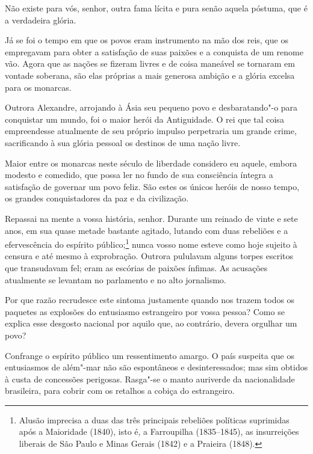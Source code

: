 \setcounter{@sectionNumCenter}{1}

\sectionitem

\begin{linenumbers}

Não existe para vós, senhor, outra fama lícita e pura senão aquela 
póstuma, que é a verdadeira glória.

Já se foi o tempo em que os povos eram instrumento na mão dos reis, que
os empregavam para obter a satisfação de suas paixões e a conquista de
um renome vão. Agora que as nações se fizeram livres e de coisa
maneável se tornaram em vontade soberana, são elas próprias a mais
generosa ambição e a glória excelsa para os monarcas.

Outrora Alexandre, arrojando à Ásia seu pequeno povo e desbaratando"-o
para conquistar um mundo, foi o maior herói da Antiguidade. O rei que
tal coisa empreendesse atualmente de seu próprio impulso perpetraria um
grande crime, sacrificando à sua glória pessoal os destinos de uma nação livre. 

Maior entre os monarcas neste século de liberdade considero eu aquele,
embora modesto e comedido, que possa ler no fundo de sua consciência
íntegra a satisfação de governar um povo feliz. São estes os únicos
heróis de nosso tempo, os grandes conquistadores da paz e da civilização.

Repassai na mente a vossa história, senhor. Durante um reinado de vinte e
sete anos, em sua quase metade bastante agitado, lutando com duas
rebeliões e a efervescência do espírito público;\footnote{ Alusão imprecisa a duas 
das três principais rebeliões políticas suprimidas após a Maioridade (1840), isto é, a 
Farroupilha (1835--1845), as insurreições liberais de São Paulo e Minas Gerais 
(1842) e a Praieira (1848).} 
nunca vosso nome esteve como hoje sujeito à censura e até mesmo à exprobração. Outrora
pululavam alguns torpes escritos que transudavam fel; eram as escórias
de paixões ínfimas. As acusações atualmente se levantam no parlamento e
no alto jornalismo.

Por que razão recrudesce este sintoma justamente quando nos trazem todos
os paquetes as explosões do entusiasmo estrangeiro por vossa pessoa?
Como se explica esse desgosto nacional por aquilo que, ao contrário,
devera orgulhar um povo?

Confrange o espírito público um ressentimento amargo. O país suspeita
que os entusiasmos de além"-mar não são espontâneos e desinteressados;
mas sim obtidos à custa de concessões perigosas. Rasga"-se o manto
auriverde da nacionalidade brasileira, para cobrir com os retalhos a
cobiça do estrangeiro.


\end{linenumbers}
